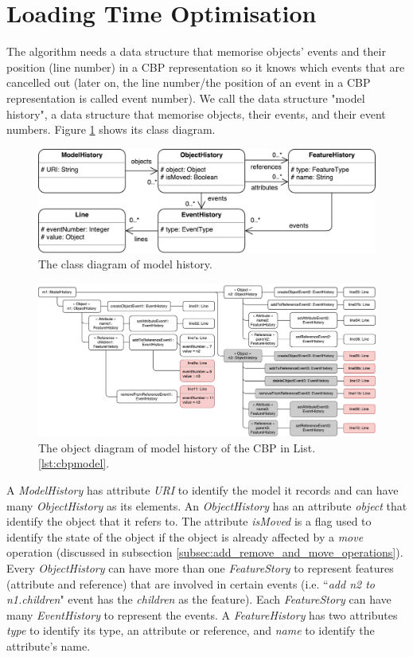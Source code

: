 \documentclass{llncs}
\begin{document}
\section{Loading Time Optimisation}
\label{sec:loading_time_optimisation}
The algorithm needs a data structure that memorise objects' events and their position (line number) in a CBP representation so it knows which events that are cancelled out (later on, the line number/the position of an event in a CBP representation is called event number). We call the data structure "model history", a data structure that memorise objects, their events, and their event numbers. Figure \ref{fig:object_history} shows its class diagram.  

\begin{figure}[ht]
\centering
\includegraphics[width=0.8\linewidth]{object_history}
\caption{The class diagram of model history.}
\label{fig:object_history}
\end{figure}

\begin{figure}[ht]
\centering
\includegraphics[width=\linewidth]{history_structure}
\caption{The object diagram of model history of the CBP in List. \ref{lst:cbpmodel}.}
\label{fig:history_structure}
\end{figure}

A \emph{ModelHistory} has attribute \emph{URI} to identify the model it records and can have many \emph{ObjectHistory} as its elements. An \emph{ObjectHistory} has an attribute \emph{object} that identify the object that it refers to. The attribute \emph{isMoved} is a flag used to identify the state of the object if the object is already affected by a \emph{move} operation (discussed in subsection \ref{subsec:add_remove_and_move_operations}). Every \emph{ObjectHistory} can have more than one \emph{FeatureStory} to represent features (attribute and reference) that are involved in certain events (i.e. ``\emph{add n2 to n1.children}" event has the \emph{children} as the feature). Each \emph{FeatureStory} can have many \emph{EventHistory} to represent the events. A \emph{FeatureHistory} has two attributes \emph{type} to identify its type, an attribute or reference, and \emph{name} to identify the attribute's name.
\end{document}
